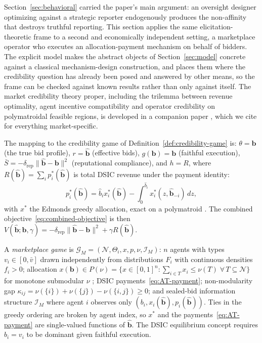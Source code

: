 \documentclass[acmsmall,nonacm,screen]{acmart}
\theoremstyle{acmplain}%
\theoremstyle{acmdefinition}%
\newcommand{\calG}{\mathcal{G}}
\newcommand{\calI}{\mathcal{I}}
\newcommand{\calN}{\mathcal{N}}
\newcommand{\Sbar}{\bar{S}}
\numberwithin{equation}{section}
\begin{document}
Section~\ref{sec:behavioral} carried the paper's main argument: an oversight designer optimizing against a strategic reporter endogenously produces the non-affinity that destroys truthful reporting. This section applies the same elicitation-theoretic frame to a second and economically independent setting, a marketplace operator who executes an allocation-payment mechanism on behalf of bidders. The explicit model makes the abstract objects of Section~\ref{sec:model} concrete against a classical mechanism-design construction, and places them where the credibility question has already been posed and answered by other means, so the frame can be checked against known results rather than only against itself. The market credibility theory proper, including the trilemma between revenue optimality, agent incentive compatibility and operator credibility on polymatroidal feasible regions, is developed in a companion paper \citep{loven2026trilemma}, which we cite for everything market-specific.

The mapping to the credibility game of Definition~\ref{def:credibility-game} is: $\theta = \mathbf{b}$ (the true bid profile), $r = \hat{\mathbf{b}}$ (effective bids), $g(\mathbf{b}) = \mathbf{b}$ (faithful execution), $\Sbar = -\delta_{\mathrm{rep}}\|\hat{\mathbf{b}} - \mathbf{b}\|^2$ (reputational compliance), and $h = R$, where $R(\hat{\mathbf{b}}) = \sum_i p_i^*(\hat{\mathbf{b}})$ is total DSIC revenue under the \citet{archer2001truthful} payment identity:
\begin{equation}\label{eq:AT-payment}
p_i^*(\hat{\mathbf{b}}) = \hat{b}_i x_i^*(\hat{\mathbf{b}})
- \int_0^{\hat{b}_i} x_i^*(z, \hat{\mathbf{b}}_{-i})\, dz,
\end{equation}
with $x^*$ the Edmonds greedy allocation, exact on a polymatroid \citep{conforti1984submodular}. The combined objective~\eqref{eq:combined-objective} is then $V(\hat{\mathbf{b}}; \mathbf{b}, \gamma) = -\delta_{\mathrm{rep}}\|\hat{\mathbf{b}} - \mathbf{b}\|^2 + \gamma R(\hat{\mathbf{b}})$.

\begin{definition}\label{def:marketplace-game}
A \emph{marketplace game} is $\calG_M = (\calN, \Theta_i, x, p, \nu, \calI_M)$: $n$ agents with types $v_i \in [0, \bar{v}]$ drawn independently from distributions $F_i$ with continuous densities $f_i > 0$; allocation $x(\mathbf{b}) \in P(\nu) = \{x \in [0,1]^n : \sum_{i \in T} x_i \leq \nu(T)\;\forall\, T \subseteq \calN\}$ for monotone submodular $\nu$ \citep[cf.][]{conforti1984submodular}; DSIC payments~\eqref{eq:AT-payment}; non-modularity gap $\kappa_{ij} = \nu(\{i\}) + \nu(\{j\}) - \nu(\{i,j\}) \geq 0$; and sealed-bid information structure $\calI_M$ where agent $i$ observes only $(b_i, x_i(\hat{\mathbf{b}}), p_i(\hat{\mathbf{b}}))$. Ties in the greedy ordering are broken by agent index, so $x^*$ and the payments~\eqref{eq:AT-payment} are single-valued functions of $\hat{\mathbf{b}}$. The DSIC equilibrium concept requires $b_i = v_i$ to be dominant given faithful execution.
\end{definition}
\end{document}
